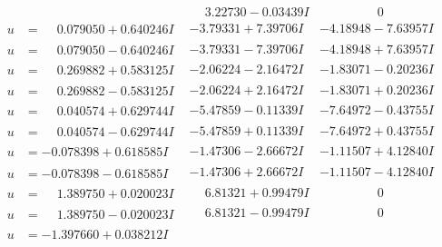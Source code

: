 \documentclass[1p]{elsarticle_modified}
\theoremstyle{definition}
\begin{document}
$$\begin{array}{c|c|c}
 & \phantom{-}3.22730 - 0.03439 I & \phantom{-0.000000 } 0 \\ \hline\begin{aligned}
u &= \phantom{-}0.079050 + 0.640246 I\end{aligned}
 & -3.79331 + 7.39706 I & -4.18948 - 7.63957 I \\ \hline\begin{aligned}
u &= \phantom{-}0.079050 - 0.640246 I\end{aligned}
 & -3.79331 - 7.39706 I & -4.18948 + 7.63957 I \\ \hline\begin{aligned}
u &= \phantom{-}0.269882 + 0.583125 I\end{aligned}
 & -2.06224 - 2.16472 I & -1.83071 - 0.20236 I \\ \hline\begin{aligned}
u &= \phantom{-}0.269882 - 0.583125 I\end{aligned}
 & -2.06224 + 2.16472 I & -1.83071 + 0.20236 I \\ \hline\begin{aligned}
u &= \phantom{-}0.040574 + 0.629744 I\end{aligned}
 & -5.47859 - 0.11339 I & -7.64972 - 0.43755 I \\ \hline\begin{aligned}
u &= \phantom{-}0.040574 - 0.629744 I\end{aligned}
 & -5.47859 + 0.11339 I & -7.64972 + 0.43755 I \\ \hline\begin{aligned}
u &= -0.078398 + 0.618585 I\end{aligned}
 & -1.47306 - 2.66672 I & -1.11507 + 4.12840 I \\ \hline\begin{aligned}
u &= -0.078398 - 0.618585 I\end{aligned}
 & -1.47306 + 2.66672 I & -1.11507 - 4.12840 I \\ \hline\begin{aligned}
u &= \phantom{-}1.389750 + 0.020023 I\end{aligned}
 & \phantom{-}6.81321 + 0.99479 I & \phantom{-0.000000 } 0 \\ \hline\begin{aligned}
u &= \phantom{-}1.389750 - 0.020023 I\end{aligned}
 & \phantom{-}6.81321 - 0.99479 I & \phantom{-0.000000 } 0 \\ \hline\begin{aligned}
u &= -1.397660 + 0.038212 I\end{aligned}

\end{array}$$
\end{document}

